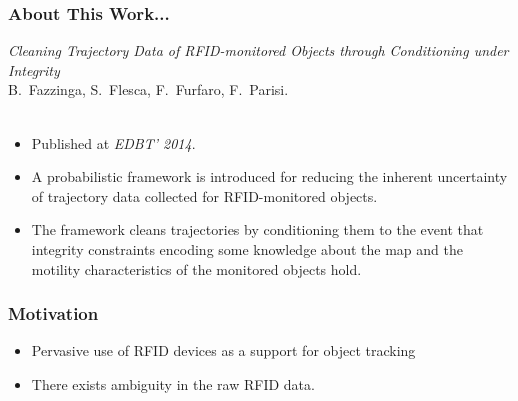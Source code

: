 \begin{frame}
\frametitle{About This Work...}

\emph{Cleaning Trajectory Data of RFID-monitored Objects through Conditioning under Integrity}~\cite{DBLP:conf/edbt/FazzingaFFP14}\\
B.~Fazzinga, S.~Flesca, F.~Furfaro, F.~Parisi.\\~\\


\begin{itemize}
  \item Published at \emph{EDBT' 2014}. %
  \item A probabilistic framework is introduced for reducing the inherent uncertainty of trajectory data collected for RFID-monitored objects.
  \item The framework cleans trajectories by conditioning them to the event that integrity constraints encoding some knowledge about the map and the motility characteristics of the monitored objects hold.
\end{itemize}

\end{frame}


\begin{frame}
\frametitle{Motivation}

\begin{itemize}
  \item Pervasive use of RFID devices as a support for object tracking
  \item There exists ambiguity in the raw RFID data.
\end{itemize}

\end{frame}

